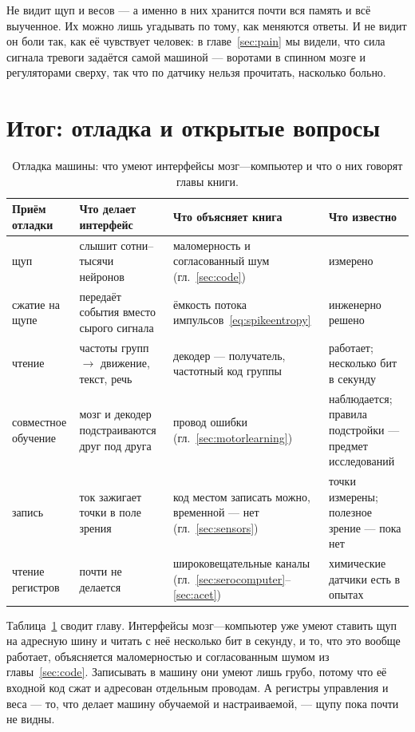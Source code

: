 Не видит щуп и весов --- а именно в них хранится почти вся память и всё выученное. Их можно лишь угадывать по тому, как меняются ответы. И не видит он боли так, как её чувствует человек: в главе~\ref{sec:pain} мы видели, что сила сигнала тревоги задаётся самой машиной --- воротами в спинном мозге и регуляторами сверху, так что по датчику нельзя прочитать, насколько больно.

\section{Итог: отладка и открытые вопросы}

\begin{table}[t]
\centering
\footnotesize
\setlength{\tabcolsep}{4pt}
\renewcommand{\arraystretch}{1.15}
\begin{tabular}{>{\raggedright}p{2.2cm}>{\raggedright}p{3.6cm}>{\raggedright}p{3.4cm}>{\raggedright\arraybackslash}p{4.0cm}}
\toprule
Приём отладки & Что делает интерфейс & Что объясняет книга & Что известно \\
\midrule
щуп & слышит сотни--тысячи нейронов & маломерность и согласованный шум (гл.~\ref{sec:code}) & измерено \\
сжатие на щупе & передаёт события вместо сырого сигнала & ёмкость потока импульсов~\eqref{eq:spikeentropy} & инженерно решено \\
чтение & частоты групп $\to$ движение, текст, речь & декодер --- получатель, частотный код группы & работает; несколько бит в секунду \\
совместное обучение & мозг и декодер подстраиваются друг под друга & провод ошибки (гл.~\ref{sec:motorlearning}) & наблюдается; правила подстройки --- предмет исследований \\
запись & ток зажигает точки в поле зрения & код местом записать можно, временной --- нет (гл.~\ref{sec:sensors}) & точки измерены; полезное зрение --- пока нет \\
чтение регистров & почти не делается & широковещательные каналы (гл.~\ref{sec:serocomputer}--\ref{sec:acet}) & химические датчики есть в опытах \\
\bottomrule
\end{tabular}
\caption{Отладка машины: что умеют интерфейсы мозг---компьютер и что о них говорят главы книги.}
\label{tab:debugging}
\end{table}

Таблица~\ref{tab:debugging} сводит главу. Интерфейсы мозг---компьютер уже умеют ставить щуп на адресную шину и читать с неё несколько бит в секунду, и то, что это вообще работает, объясняется маломерностью и согласованным шумом из главы~\ref{sec:code}. Записывать в машину они умеют лишь грубо, потому что её входной код сжат и адресован отдельным проводам. А регистры управления и веса --- то, что делает машину обучаемой и настраиваемой, --- щупу пока почти не видны.

